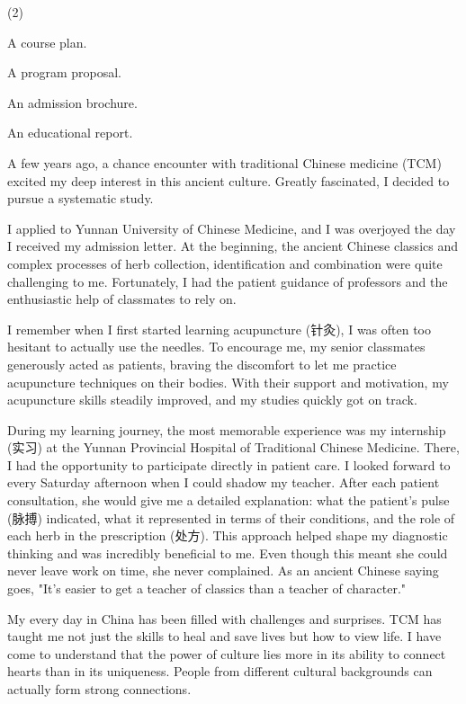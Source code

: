 \documentclass{英语试卷}
\begin{document}
\begin{choices}(2)
  \item A course plan.
  \item A program proposal.
  \item An admission brochure.
  \item An educational report.
\end{choices}
\par A few years ago, a chance encounter with traditional Chinese medicine (TCM) excited my deep interest in this ancient culture. Greatly fascinated, I decided to pursue a systematic study.\par
\par I applied to Yunnan University of Chinese Medicine, and I was overjoyed the day I received my admission letter. At the beginning, the ancient Chinese classics and complex processes of herb collection, identification and combination were quite challenging to me. Fortunately, I had the patient guidance of professors and the enthusiastic help of classmates to rely on.\par
\par I remember when I first started learning acupuncture (针灸), I was often too hesitant to actually use the needles. To encourage me, my senior classmates generously acted as patients, braving the discomfort to let me practice acupuncture techniques on their bodies. With their support and motivation, my acupuncture skills steadily improved, and my studies quickly got on track.\par
\par During my learning journey, the most memorable experience was my internship (实习) at the Yunnan Provincial Hospital of Traditional Chinese Medicine. There, I had the opportunity to participate directly in patient care. I looked forward to every Saturday afternoon when I could shadow my teacher. After each patient consultation, she would give me a detailed explanation: what the patient's pulse (脉搏) indicated, what it represented in terms of their conditions, and the role of each herb in the prescription (处方). This approach helped shape my diagnostic thinking and was incredibly beneficial to me. Even though this meant she could never leave work on time, she never complained. As an ancient Chinese saying goes, "It’s easier to get a teacher of classics than a teacher of character."\par
\par My every day in China has been filled with challenges and surprises. TCM has taught me not just the skills to heal and save lives but how to view life. I have come to understand that the power of culture lies more in its ability to connect hearts than in its uniqueness. People from different cultural backgrounds can actually form strong connections.\par
\end{document}

